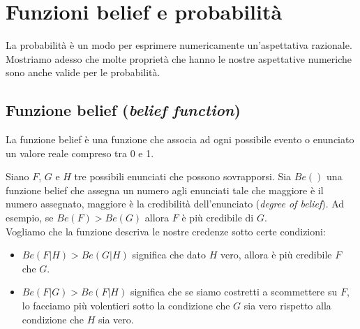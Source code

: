 \documentclass[../main.tex]{subfiles}
\begin{document}
\section{Funzioni belief e probabilità}
La probabilità è un modo per esprimere numericamente un'aspettativa razionale.
Mostriamo adesso che molte proprietà che hanno le nostre aspettative numeriche sono anche valide per le probabilità.
\subsection{Funzione belief (\textit{belief function})}
\begin{definition}
    \label{def:funzione_belief}
    La funzione belief è una funzione che associa ad ogni possibile evento o enunciato un valore reale compreso tra 0 e 1.
\end{definition}
\hfill \break
Siano $F$, $G$ e $H$ tre possibili enunciati che possono sovrapporsi.
Sia $Be()$ una funzione belief che assegna un numero agli enunciati tale che maggiore è il numero assegnato, maggiore è la credibilità dell'enunciato (\textit{degree of belief}).
Ad esempio, se $Be(F) > Be(G)$ allora $F$ è più credibile di $G$.\\
Vogliamo che la funzione descriva le nostre credenze sotto certe condizioni:
\begin{itemize}
    \item $Be(F|H) > Be(G|H)$ significa che dato $H$ vero, allora è più credibile $F$ che $G$.
    \item $Be(F|G) > Be(F|H)$ significa che se siamo costretti a scommettere su $F$, lo facciamo più volentieri sotto la condizione che $G$ sia vero rispetto alla condizione che $H$ sia vero.
\end{itemize}
\end{document}
